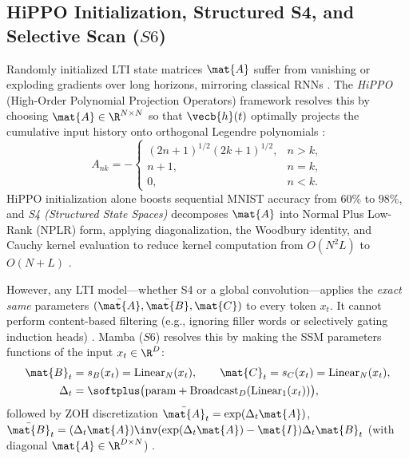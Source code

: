 \documentclass[../../../../master.tex]{subfiles}
\begin{document}
\subsection{HiPPO Initialization, Structured S4, and Selective Scan ($S6$)}

Randomly initialized LTI state matrices $\mat{A}$ suffer from vanishing or exploding gradients over long horizons, mirroring classical RNNs . The \emph{HiPPO} (High-Order Polynomial Projection Operators) framework resolves this by choosing $\mat{A} \in \R^{N \times N}$ so that $\vecb{h}(t)$ optimally projects the cumulative input history onto orthogonal Legendre polynomials :
\begin{equation}\label{eq:ssm:hippo}
  A_{nk} = - \begin{cases}
    (2n + 1)^{1/2}(2k + 1)^{1/2}, & n > k, \\
    n + 1, & n = k, \\
    0, & n < k.
  \end{cases}
\end{equation}
HiPPO initialization alone boosts sequential MNIST accuracy from $60\%$ to $98\%$, and \emph{S4 (Structured State Spaces)} decomposes $\mat{A}$ into Normal Plus Low-Rank (NPLR) form, applying diagonalization, the Woodbury identity, and Cauchy kernel evaluation to reduce kernel computation from $O(N^2 L)$ to $O(N + L)$ .

However, any LTI model---whether S4 or a global convolution---applies the \emph{exact same} parameters $(\bar{\mat{A}}, \bar{\mat{B}}, \mat{C})$ to every token $x_t$. It cannot perform content-based filtering (e.g., ignoring filler words or selectively gating induction heads) . Mamba ($S6$) resolves this by making the SSM parameters functions of the input $x_t \in \R^D$:
\begin{equation}\label{eq:ssm:selective_params}
\begin{aligned}
  \mat{B}_t &= s_B(x_t) = \mathrm{Linear}_N(x_t), \qquad
  \mat{C}_t = s_C(x_t) = \mathrm{Linear}_N(x_t), \\
  \Delta_t &= \softplus\bigl(\text{param} + \mathrm{Broadcast}_D(\mathrm{Linear}_1(x_t))\bigr),
\end{aligned}
\end{equation}
followed by ZOH discretization $\bar{\mat{A}}_t = \exp(\Delta_t \mat{A})$, $\bar{\mat{B}}_t = (\Delta_t \mat{A})\inv(\exp(\Delta_t \mat{A}) - \mat{I})\Delta_t \mat{B}_t$ (with diagonal $\mat{A} \in \R^{D \times N}$) .
\end{document}

